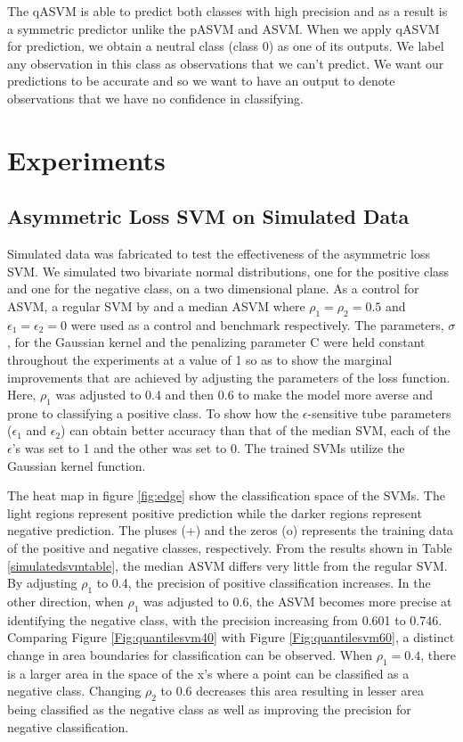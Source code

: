 \documentclass[twoside,11pt]{article}
\begin{document}
The qASVM is able to predict both classes with high precision and as a result is a symmetric predictor unlike the pASVM and ASVM. When we apply qASVM for prediction, we obtain a neutral class (class 0) as one of its outputs. We label any observation in this class as observations that we can't predict. We want our predictions to be accurate and so we want to have an output to denote observations that we have no confidence in classifying.

\section{Experiments}
\subsection{Asymmetric Loss SVM on Simulated Data}\label{simulation}
Simulated data was fabricated to test the effectiveness of the asymmetric loss SVM. We simulated two bivariate normal distributions, one for the positive class and one for the negative class, on a two dimensional plane. As a control for ASVM, a regular SVM by \citet{Vapnik98} and a median ASVM where $\rho_1=\rho_2=0.5$ and $\epsilon_1=\epsilon_2=0$ were used as a control and benchmark respectively. The parameters, $\sigma$, for the Gaussian kernel and the penalizing parameter C were held constant throughout the experiments at a value of 1 so as to show the marginal improvements that are achieved by adjusting the parameters of the loss function. Here, $\rho_1$ was adjusted to 0.4 and then 0.6 to make the model more averse and prone to classifying a positive class. To show how the $\epsilon$-sensitive tube parameters ($\epsilon_1$ and $\epsilon_2$) can obtain better accuracy than that of the median SVM, each of the $\epsilon$'s was set to 1 and the other was set to 0. The trained SVMs utilize the Gaussian kernel function. 

The heat map in figure \ref{fig:edge} show the classification space of the SVMs. The light regions represent positive prediction while the darker regions represent negative prediction. The pluses (+) and the zeros (o) represents the training data of the positive and negative classes, respectively. From the results shown in Table \ref{simulatedsvmtable}, the median ASVM differs very little from the regular SVM. By adjusting $\rho_1$ to 0.4, the precision of positive classification increases. In the other direction, when $\rho_1$ was adjusted to 0.6, the ASVM becomes more precise at identifying the negative class, with the precision increasing from 0.601 to 0.746. Comparing Figure \ref{Fig:quantilesvm40} with Figure \ref{Fig:quantilesvm60}, a distinct change in area boundaries for classification can be observed. When $\rho_1=0.4$, there is a larger area in the space of the x's where a point can be classified as a negative class. Changing $\rho_2$ to 0.6 decreases this area resulting in lesser area being classified as the negative class as well as improving the precision for negative classification.
\end{document}
